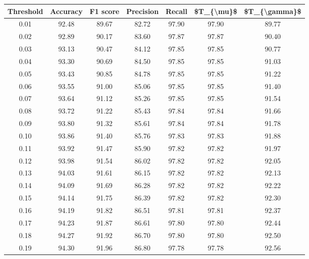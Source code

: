 \begin{tabular}{|c|c|c|c|c|c|c|}
\hline
 Threshold &  Accuracy &  F1 score &  Precision &  Recall &  \$T\_\{\textbackslash mu\}\$ &  \$T\_\{\textbackslash gamma\}\$ \\
\hline
      0.01 &     92.48 &     89.67 &      82.72 &   97.90 &      97.90 &         89.77 \\
      0.02 &     92.89 &     90.17 &      83.60 &   97.87 &      97.87 &         90.40 \\
      0.03 &     93.13 &     90.47 &      84.12 &   97.85 &      97.85 &         90.77 \\
      0.04 &     93.30 &     90.69 &      84.50 &   97.85 &      97.85 &         91.03 \\
      0.05 &     93.43 &     90.85 &      84.78 &   97.85 &      97.85 &         91.22 \\
      0.06 &     93.55 &     91.00 &      85.06 &   97.85 &      97.85 &         91.40 \\
      0.07 &     93.64 &     91.12 &      85.26 &   97.85 &      97.85 &         91.54 \\
      0.08 &     93.72 &     91.22 &      85.43 &   97.84 &      97.84 &         91.66 \\
      0.09 &     93.80 &     91.32 &      85.61 &   97.84 &      97.84 &         91.78 \\
      0.10 &     93.86 &     91.40 &      85.76 &   97.83 &      97.83 &         91.88 \\
      0.11 &     93.92 &     91.47 &      85.90 &   97.82 &      97.82 &         91.97 \\
      0.12 &     93.98 &     91.54 &      86.02 &   97.82 &      97.82 &         92.05 \\
      0.13 &     94.03 &     91.61 &      86.15 &   97.82 &      97.82 &         92.13 \\
      0.14 &     94.09 &     91.69 &      86.28 &   97.82 &      97.82 &         92.22 \\
      0.15 &     94.14 &     91.75 &      86.39 &   97.82 &      97.82 &         92.30 \\
      0.16 &     94.19 &     91.82 &      86.51 &   97.81 &      97.81 &         92.37 \\
      0.17 &     94.23 &     91.87 &      86.61 &   97.80 &      97.80 &         92.44 \\
      0.18 &     94.27 &     91.92 &      86.70 &   97.80 &      97.80 &         92.50 \\
      0.19 &     94.30 &     91.96 &      86.80 &   97.78 &      97.78 &         92.56 \\

\end{tabular}
